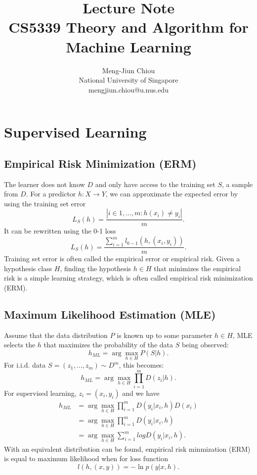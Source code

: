 \documentclass{article}
\title{\textbf{Lecture Note} \\
		\large CS5339 Theory and Algorithm for Machine Learning}
\author{Meng-Jiun Chiou \\ National University of Singapore \\ mengjiun.chiou@u.nus.edu}
\date{}
\begin{document}
    \maketitle 
    \section{Supervised Learning}
    \subsection{Empirical Risk Minimization (ERM)}
    The learner does not know $D$ and only have access to the training set $S$, a sample from $D$. For a predictor $h: X \rightarrow Y$, we can approximate the expected error by using the training set error
    \begin{equation}
    L_S(h) = \frac{|i \in {1,...,m}:h(x_i) \neq y_i|}{m}.
    \end{equation}
    It can be rewritten using the 0-1 loss
    \begin{equation}
    L_S(h) = \frac{\sum_{i=1}^m l_{0-1}(h, (x_i, y_i))}{m}.
    \end{equation}
    Training set error is often called the empirical error or empirical risk. Given a hypothesis class $H$, finding the hypothesis $h \in H$ that minimizes the empirical risk is a simple learning strategy, which is often called empirical risk minimization (ERM).
    
    
    \subsection{Maximum Likelihood Estimation (MLE)}
    Assume that the data distribution $P$ is known up to some parameter $h \in H$, MLE selects the $h$ that maximizes the probability of the data $S$ being observed:
    \begin{equation}
    h_{ML} = \arg \max_{h\in H} P(S|h).
    \end{equation}
    For i.i.d. data $S = (z_1,...,z_m) \sim D^m$, this becomes:
    \begin{equation}
    h_{ML} = \arg \max_{h \in H} \prod_{i=1}^m D(z_i | h).
    \end{equation}
    For supervised learning, $z_i = (x_i, y_i)$ and we have
    \begin{align}
    h_{ML} &= \arg \max_{h \in H} \prod_{i=1}^m D(y_i | x_i, h) D(x_i) \\
    	   &= \arg \max_{h \in H} \prod_{i=1}^m D(y_i | x_i, h) \\
           &= \arg \max_{h \in H} \sum_{i=1}^m log D(y_i | x_i, h).
    \end{align}
    With an equivalent distribution can be found, empirical risk minmization (ERM) is equal to maximum likelihood when for loss function
    \begin{equation}
    l(h, (x,y)) = -\ln p(y|x,h).
    \end{equation}
    
\end{document}
